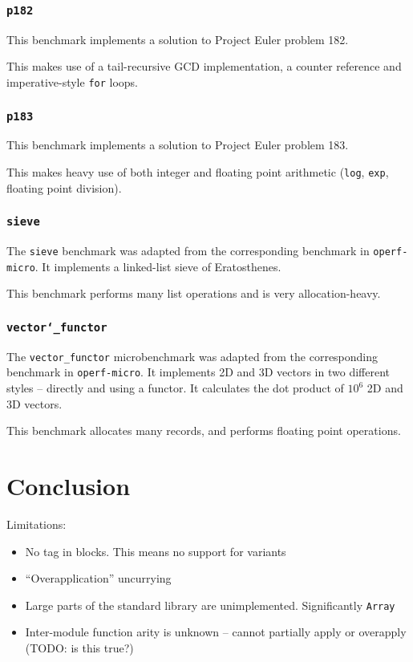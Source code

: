 \documentclass[12pt,a4paper,twoside,openright]{report}
\begin{document}
\subsection{\texttt{p182}}

This benchmark implements a solution to Project Euler problem 182.

This makes use of a tail-recursive GCD implementation, a counter reference and imperative-style \lstinline!for! loops.

\subsection{\texttt{p183}}

This benchmark implements a solution to Project Euler problem 183.

This makes heavy use of both integer and floating point arithmetic (\lstinline!log!, \lstinline!exp!, floating point division).

\subsection{\texttt{sieve}}

The \lstinline!sieve! benchmark was adapted from the corresponding benchmark in
\lstinline!operf-micro!. It implements a linked-list sieve of Eratosthenes.

This benchmark performs many list operations and is very allocation-heavy.

\subsection{\texttt{vector\char`_functor}}

The \lstinline!vector_functor! microbenchmark was adapted from the corresponding
benchmark in \lstinline!operf-micro!. It implements 2D and 3D vectors in two
different styles -- directly and using a functor. It calculates the dot product
of $10^6$ 2D and 3D vectors.

This benchmark allocates many records, and performs floating point operations.

\chapter{Conclusion}\label{conclusion}

Limitations:

\begin{itemize}
  \item No tag in blocks. This means no support for variants
  \item ``Overapplication'' uncurrying
  \item Large parts of the standard library are unimplemented. Significantly \lstinline!Array!
  \item Inter-module function arity is unknown -- cannot partially apply or overapply (TODO: is this true?)
\end{itemize}
\end{document}
